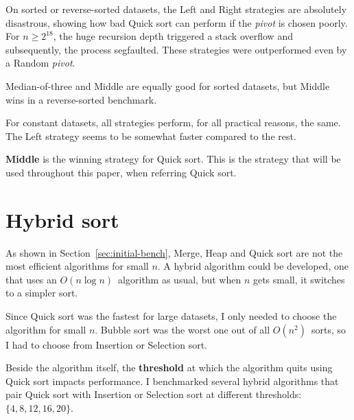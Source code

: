 \documentclass[11pt, a4paper]{article}
\newcommand{\Onn}{$O(n^2)$}
\newcommand{\Onlogn}{$O(n \log n)$}
\begin{document}
\newpage
On sorted or reverse-sorted datasets, the Left and Right strategies are absolutely disastrous, showing how bad Quick sort can perform if the \textit{pivot} is chosen poorly. For $n \geq 2^{18}$, the huge recursion depth triggered a stack overflow and subsequently, the process segfaulted. These strategies were outperformed even by a Random \textit{pivot}.

Median-of-three and Middle are equally good for sorted datasets, but Middle wins in a reverse-sorted benchmark.

For constant datasets, all strategies perform, for all practical reasons, the same. The Left strategy seems to be somewhat faster compared to the rest.

\textbf{Middle} is the winning strategy for Quick sort. This is the strategy that will be used throughout this paper, when referring Quick sort.


\newpage
\section{Hybrid sort}
As shown in Section~\ref{sec:initial-bench}, Merge, Heap and Quick sort are not the most efficient algorithms for small $n$. A hybrid algorithm could be developed, one that uses an \Onlogn\ algorithm as usual, but when $n$ gets small, it switches to a simpler sort.

Since Quick sort was the fastest for large datasets, I only needed to choose the algorithm for small $n$. Bubble sort was the worst one out of all \Onn\ sorts, so I had to choose from Insertion or Selection sort.

Beside the algorithm itself, the \textbf{threshold} at which the algorithm quits using Quick sort impacts performance. I benchmarked several hybrid algorithms that pair Quick sort with Insertion or Selection sort at different thresholds: $\{4, 8, 12, 16, 20\}$.

\begin{center}
\end{center}
\end{document}

